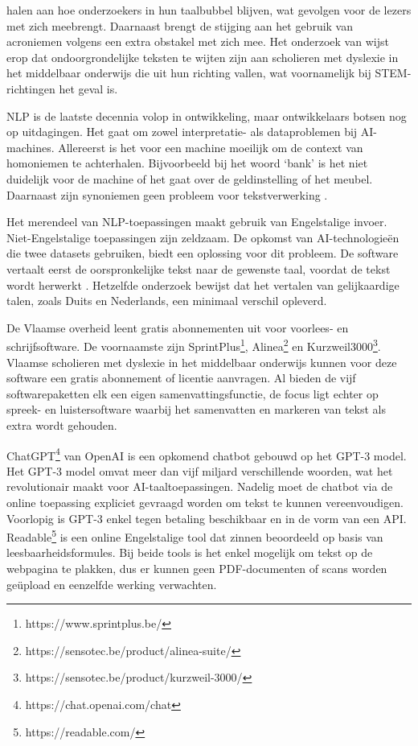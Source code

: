 \textcite{PlavenSigray2017} halen aan hoe onderzoekers in hun taalbubbel blijven, wat gevolgen voor de lezers met zich meebrengt. Daarnaast brengt de stijging aan het gebruik van acroniemen volgens \textcite{Barnett2020} een extra obstakel met zich mee. Het onderzoek van \textcite{Donato2022} wijst erop dat ondoorgrondelijke teksten te wijten zijn aan scholieren met dyslexie in het middelbaar onderwijs die uit hun richting vallen, wat voornamelijk bij STEM-richtingen het geval is. 

NLP is de laatste decennia volop in ontwikkeling, maar ontwikkelaars botsen nog op uitdagingen. Het gaat om zowel interpretatie- als dataproblemen bij AI-machines. Allereerst is het voor een machine moeilijk om de context van homoniemen te achterhalen. Bijvoorbeeld bij het woord ‘bank’ is het niet duidelijk voor de machine of het gaat over de geldinstelling of het meubel. Daarnaast zijn synoniemen geen probleem voor tekstverwerking \autocite{Roldos2020}.

Het merendeel van NLP-toepassingen maakt gebruik van Engelstalige invoer. Niet-Engelstalige toepassingen zijn zeldzaam. De opkomst van AI-technologieën die twee datasets gebruiken, biedt een oplossing voor dit probleem. De software vertaalt eerst de oorspronkelijke tekst naar de gewenste taal, voordat de tekst wordt herwerkt \autocite{Sciforce2020}. Hetzelfde onderzoek bewijst dat het vertalen van gelijkaardige talen, zoals Duits en Nederlands, een minimaal verschil opleverd.

De Vlaamse overheid leent gratis abonnementen uit voor voorlees- en schrijfsoftware. De voornaamste zijn SprintPlus\footnote{https://www.sprintplus.be/}, Alinea\footnote{https://sensotec.be/product/alinea-suite/} en Kurzweil3000\footnote{https://sensotec.be/product/kurzweil-3000/}. Vlaamse scholieren met dyslexie in het middelbaar onderwijs kunnen voor deze software een gratis abonnement of licentie aanvragen. Al bieden de vijf softwarepaketten elk een eigen samenvattingsfunctie, de focus ligt echter op spreek- en luistersoftware waarbij het samenvatten en markeren van tekst als extra wordt gehouden.

ChatGPT\footnote{https://chat.openai.com/chat} van OpenAI is een opkomend chatbot gebouwd op het GPT-3 model. Het GPT-3 model omvat meer dan vijf miljard verschillende woorden, wat het revolutionair maakt voor AI-taaltoepassingen. Nadelig moet de chatbot via de online toepassing expliciet gevraagd worden om tekst te kunnen vereenvoudigen. Voorlopig is GPT-3 enkel tegen betaling beschikbaar en in de vorm van een API. Readable\footnote{https://readable.com/} is een online Engelstalige tool dat zinnen beoordeeld op basis van leesbaarheidsformules. Bij beide tools is het enkel mogelijk om tekst op de webpagina te plakken, dus er kunnen geen PDF-documenten of scans worden geüpload en eenzelfde werking verwachten.

